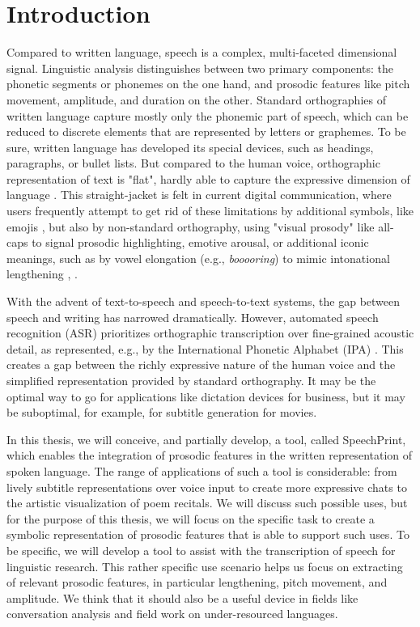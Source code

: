 \chapter{Introduction}

Compared to written language, speech is a complex, multi-faceted dimensional signal. Linguistic analysis distinguishes between two primary components: the phonetic segments or phonemes on the one hand, and prosodic features like pitch movement, amplitude, and duration on the other. Standard orthographies of written language capture mostly only the phonemic part of speech, which can be reduced to discrete elements that are represented by letters or graphemes. To be sure, written language has developed its special devices, such as headings, paragraphs, or bullet lists. But compared to the human voice, orthographic representation of text is "flat", hardly able to capture the expressive dimension of language \cite{pataca2021speech}. This straight-jacket is felt in current digital communication, where users frequently attempt to get rid of these limitations by additional symbols, like emojis \cite{zappavigna2024}, but also by non-standard orthography, using "visual prosody" like all-caps to signal prosodic highlighting, emotive arousal, or additional iconic meanings, such as by vowel elongation (e.g., \textit{booooring}) to mimic intonational lengthening \cite{fuchs2019}, \cite{heath2020no}.

With the advent of text-to-speech and speech-to-text systems, the gap between speech and writing has narrowed dramatically. However, automated speech recognition (ASR) prioritizes orthographic transcription over fine-grained acoustic detail, as represented, e.g., by the International Phonetic Alphabet (IPA) \cite{internationalphoneticassociation1999ipa}. This creates a gap between the richly expressive nature of the human voice and the simplified representation provided by standard orthography. It may be the optimal way to go for applications like dictation devices for business, but it may be suboptimal, for example, for subtitle generation for movies.

In this thesis, we will conceive, and partially develop, a tool, called SpeechPrint, which enables the integration of prosodic features in the written representation of spoken language. The range of applications of such a tool is considerable: from lively subtitle representations over voice input to create more expressive chats to the artistic visualization of poem recitals. We will discuss such possible uses, but for the purpose of this thesis, we will focus on the specific task to create a symbolic representation of prosodic features that is able to support such uses. To be specific, we will develop a tool to assist with the transcription of speech for linguistic research. This rather specific use scenario helps us focus on extracting of relevant prosodic features, in particular lengthening, pitch movement, and amplitude. We think that it should also be a useful device in fields like conversation analysis and field work on under-resourced languages.

